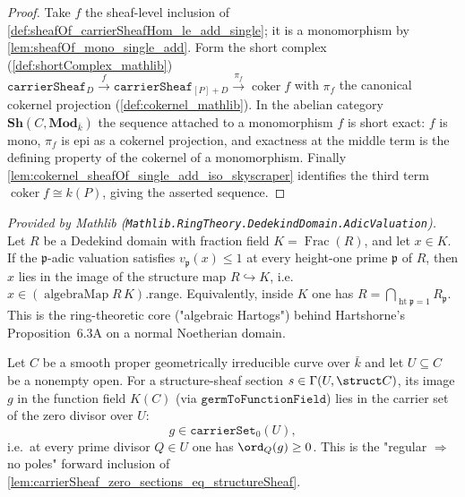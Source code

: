 \begin{proof}
        \leanok
  Take \(f\) the sheaf-level inclusion of
  \cref{def:sheafOf_carrierSheafHom_le_add_single}; it is a monomorphism by
  \cref{lem:sheafOf_mono_single_add}. Form the short complex
  (\cref{def:shortComplex_mathlib})
  \(\texttt{carrierSheaf}_D \xrightarrow{f} \texttt{carrierSheaf}_{[P]+D}
  \xrightarrow{\pi_f} \operatorname{coker} f\) with \(\pi_f\) the canonical
  cokernel projection (\cref{def:cokernel_mathlib}). In the abelian category
  \(\mathbf{Sh}(C, \mathbf{Mod}_{\bar k})\) the sequence attached to a
  monomorphism \(f\) is short exact: \(f\) is mono, \(\pi_f\) is epi as a
  cokernel projection, and exactness at the middle term is the defining
  property of the cokernel of a monomorphism. Finally
  \cref{lem:cokernel_sheafOf_single_add_iso_skyscraper} identifies the third
  term \(\operatorname{coker} f \cong k(P)\), giving the asserted sequence.
\end{proof}

\begin{lemma}
  \label{lem:mem_integers_of_valuation_le_one}
  \mathlibok
  \textit{Provided by Mathlib (\texttt{Mathlib.RingTheory.DedekindDomain.AdicValuation}).}
  Let \(R\) be a Dedekind domain with fraction field
  \(K = \operatorname{Frac}(R)\), and let \(x \in K\). If the
  \(\mathfrak p\)-adic valuation satisfies \(v_{\mathfrak p}(x) \le 1\) at every
  height-one prime \(\mathfrak p\) of \(R\), then \(x\) lies in the image of the
  structure map \(R \hookrightarrow K\), i.e.\
  \(x \in (\operatorname{algebraMap} R\,K).\mathrm{range}\). Equivalently, inside
  \(K\) one has \(R = \bigcap_{\operatorname{ht}\mathfrak p = 1} R_{\mathfrak p}\).
  This is the ring-theoretic core ("algebraic Hartogs") behind
  Hartshorne's Proposition~6.3A on a normal Noetherian domain.
\end{lemma}

\begin{lemma}
  \label{lem:structureSection_mem_carrierSet_zero}
  \uses{def:sheafOf_carrierSet, def:order_at_point}
  Let \(C\) be a smooth proper geometrically irreducible curve over \(\bar k\)
  and let \(U \subseteq C\) be a nonempty open. For a structure-sheaf section
  \(s \in \Gamma(U, \struct C)\), its image \(g\) in the function field
  \(K(C)\) (via \(\texttt{germToFunctionField}\)) lies in the carrier set of the
  zero divisor over \(U\):
  \[
    g \in \texttt{carrierSet}_0(U),
  \]
  i.e.\ at every prime divisor \(Q \in U\) one has \(\ord_Q(g) \ge 0\). This is
  the "regular \(\Rightarrow\) no poles" forward inclusion of
  \cref{lem:carrierSheaf_zero_sections_eq_structureSheaf}.
\end{lemma}

